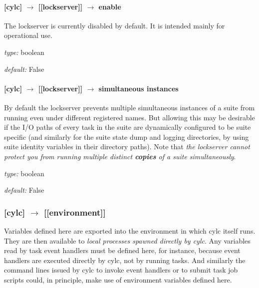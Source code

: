 \paragraph[enable]{[cylc] $\rightarrow$ [[lockserver]] $\rightarrow$ enable}

The lockserver is currently disabled by default. It is intended mainly for
operational use.

\begin{myitemize}
    \item {\em type:} boolean
    \item {\em default:} False
\end{myitemize}

\paragraph[simultaneous instances]{[cylc] $\rightarrow$ [[lockserver]] $\rightarrow$ simultaneous instances}

By default the lockserver prevents multiple simultaneous instances of a
suite from running even under different registered names. But allowing
this may be desirable if the I/O paths of every task in the suite are
dynamically configured to be suite specific (and similarly for the suite
state dump and logging directories, by using suite identity variables in
their directory paths). Note that {\em the lockserver cannot protect you
from running multiple distinct {\bf copies} of a suite simultaneously}. 

\begin{myitemize}
    \item {\em type:} boolean
    \item {\em default:} False
\end{myitemize}

\subsubsection[{[[}environment{]]} ]{[cylc] $\rightarrow$ [[environment]]}

Variables defined here are exported into the environment in which cylc
itself runs. They are then available to {\em local processes spawned
directly by cylc}. Any variables read by task event handlers must be
defined here, for instance, because event handlers are executed
directly by cylc, not by running tasks. And similarly the {command
lines} issued by cylc to invoke event handlers or to submit task 
job scripts could, in principle, make use of environment variables
defined here. 
